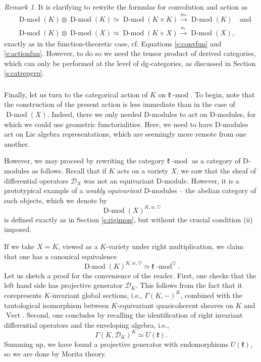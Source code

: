 \documentclass[10pt]{amsart}
\newcommand{\on}{\operatorname}
\renewcommand{\mod}{\on{-mod}}
\newcommand{\Dmod}{\on{D-mod}}
\theoremstyle{remark}
\newtheorem{re}[subsubsection]{Remark}
\newcommand{\fk}{\mathfrak{k}}
\newcommand{\sD}{\mathscr{D}}
\numberwithin{equation}{section}
\renewcommand{\mod}{\operatorname{-mod}}
\begin{document}
	
	\begin{re} It is clarifying to rewrite the formulas for convolution and 
	action as
		\begin{align*}
		&\Dmod(K) \otimes \Dmod(K) \simeq \Dmod(K \times K) \xrightarrow{m_*} 
		\Dmod(K) \quad \text{and} \\ &\Dmod(K) \otimes \Dmod(X) \simeq 
		\Dmod(K \times X) \xrightarrow{a_*} \Dmod(X),
		\end{align*}
	exactly as in the function-theoretic case, cf. Equations \eqref{e:convfun} 
	and \eqref{e:actionfun}. However, to do so we need the tensor product of 
	derived categories, which can only be performed at the level of 
	dg-categories, as discussed in Section \ref{s:catrepgrp}.  	
	\end{re}
	
	
	\subsubsection{}\label{ss:weakinv} Finally, let us turn to the categorical action of $K$ on 
	$\fk\mod$. To begin, note that the construction of the present action is 
	less immediate 	than in the case of $\Dmod(X)$.  Indeed, there we only 
	needed D-modules to act	on D-modules, for which we could use geometric 
	functorialities. Here, we need to have D-modules act on Lie algebra 
	representations, which are seemingly more remote from one another. 
	
	
	However, we may proceed by rewriting the category $\fk\mod$ as a category 
	of D-modules as follows. Recall that if $K$ acts on a variety $X$, we saw 
	that the sheaf of differential operators $\sD_X$ was not an equivariant 
	D-module. However, it is a prototypical example of a {\em weakly
	equivariant} D-modules -- the abelian category of such objects, which we 
	denote by 
%
\[
     \Dmod(X)^{K, w, \heartsuit}
\]
%
 is defined exactly as in Section \ref{s:rigimon}, but without the crucial condition 
 (ii) imposed. 


If we take $X = K$, viewed as a $K$-variety under right multiplication, we 
claim that one has a canonical equivalence 
%
\begin{equation} \label{e:weakinvdmod}
    \Dmod(K)^{K, w, \heartsuit} \simeq \fk\mod^\heartsuit. 
\end{equation}
%
Let us sketch a proof for the convenience of the reader. First, one checks that 
the left hand side has projective generator $\sD_K$. This follows from the fact 
that it corepresents $K$-invariant global sections, i.e., $\Gamma(K, -)^K$, combined with the tautological isomorphism between $K$-equivariant quasicoherent sheaves on 
$K$ and $\on{Vect}$. Second, one concludes by recalling the identification of 
right invariant differential operators and the enveloping algebra, i.e., 
%
\[
     \Gamma(K, \sD_K)^K \simeq U(\fk). 
\]
%
Summing up, we have found a projective generator with endomorphisms $U(\fk)$, so we are done by Morita theory.
\end{document}
